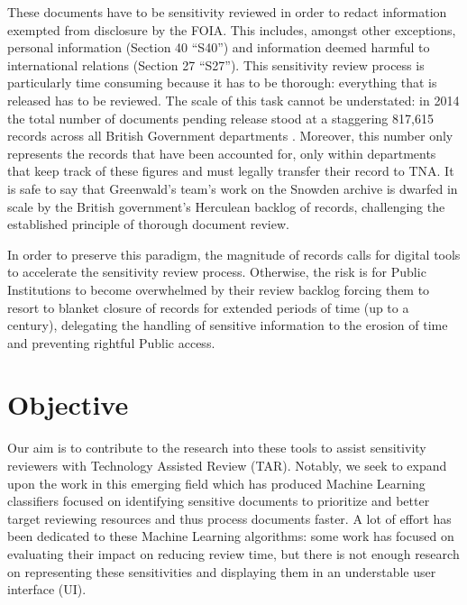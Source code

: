 \documentclass[\version]{l4proj}
\begin{document}
These documents have to be sensitivity reviewed in order to redact information exempted from disclosure by the FOIA.
This includes, amongst other exceptions, personal information (Section 40 ``S40'') and information deemed harmful to international relations (Section 27 ``S27''). %
This sensitivity review process is particularly time consuming because it has to be thorough: everything that is released has to be reviewed.
The scale of this task cannot be understated: in 2014 the total number of documents pending release stood at a staggering 817,615 records across all British Government departments \autocite{allanRecordsReview2014,thenationalarchivesRecordTransferReport2014}.
Moreover, this number only represents the records that have been accounted for, only within departments that keep track of these figures and must legally transfer their record to TNA.
It is safe to say that Greenwald's team's work on the Snowden archive is dwarfed in scale by the British government's Herculean backlog of records, challenging the established principle of thorough document review.

In order to preserve this paradigm, the magnitude of records calls for digital tools to accelerate the sensitivity review process.
Otherwise, the risk is for Public Institutions to become overwhelmed by their review backlog forcing them to resort to blanket closure of records for extended periods of time (up to a century), delegating the handling of sensitive information to the erosion of time and preventing rightful Public access.

\section{Objective}

Our aim is to contribute to the research into these tools to assist sensitivity reviewers with Technology Assisted Review (TAR).
Notably, we seek to expand upon the work in this emerging field which has produced Machine Learning classifiers focused on identifying sensitive documents to prioritize and better target reviewing resources and thus process documents faster.
A lot of effort has been dedicated to these Machine Learning algorithms: some work has focused on evaluating their impact on reducing review time, but there is not enough research on representing these sensitivities and displaying them in an understable user interface (UI).
\end{document}
